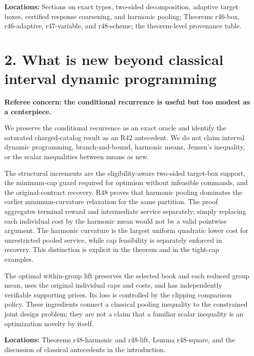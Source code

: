 \documentclass[11pt,letterpaper]{article}
\begin{document}
\textbf{Locations:} Sections on exact types, two-sided decomposition, adaptive target boxes, certified response coarsening, and harmonic pooling; Theorems r46-box, r46-adaptive, r47-variable, and r48-scheme; the theorem-level provenance table.



\section*{2. What is new beyond classical interval dynamic programming}


\textbf{Referee concern: the conditional recurrence is useful but too modest as a centerpiece.}



We preserve the conditional recurrence as an exact oracle and identify the saturated charged-catalog result as an R42 antecedent. We do not claim interval dynamic programming, branch-and-bound, harmonic means, Jensen's inequality, or the scalar inequalities between means as new.



The structural increments are the eligibility-aware two-sided target-box support, the minimum-cap guard required for optimism without infeasible commands, and the original-contract recovery. R48 proves that harmonic pooling dominates the earlier minimum-curvature relaxation for the same partition. The proof aggregates terminal reward and intermediate service separately; simply replacing each individual cost by the harmonic mean would not be a valid pointwise argument. The harmonic curvature is the largest uniform quadratic lower cost for unrestricted pooled service, while cap feasibility is separately enforced in recovery. This distinction is explicit in the theorem and in the tight-cap examples.



The optimal within-group lift preserves the selected book and each reduced group mean, uses the original individual caps and costs, and has independently verifiable supporting prices. Its loss is controlled by the clipping comparison policy. These ingredients connect a classical pooling inequality to the constrained joint design problem; they are not a claim that a familiar scalar inequality is an optimization novelty by itself.



\textbf{Locations:} Theorems r48-harmonic and r48-lift, Lemma r48-square, and the discussion of classical antecedents in the introduction.
\end{document}
